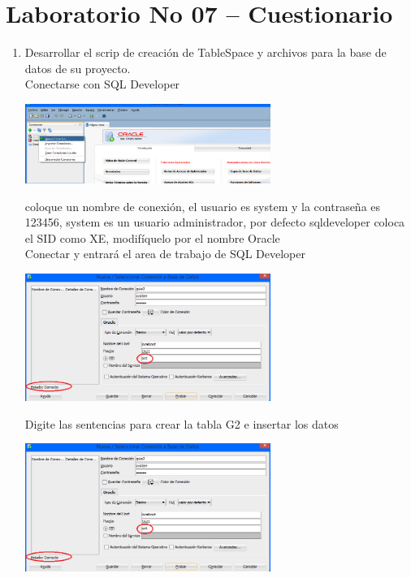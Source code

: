 \section{Laboratorio No 07 – Cuestionario} 

\begin{enumerate}[1.]
	
	\item Desarrollar el scrip de creaci\'on de TableSpace y archivos para la base de datos de su proyecto.
	\\Conectarse con SQL Developer

	\begin{center}
	\includegraphics[width=8cm]{./Imagenes/eje7_con}
	\end{center}	
	coloque un nombre de conexi\'on, el usuario es system y la contraseña es 123456, system es un usuario administrador, por defecto sqldeveloper coloca el SID como XE, modif\'iquelo por el nombre Oracle
	\\Conectar y entrar\'a el area de trabajo de SQL Developer

	\begin{center}
	\includegraphics[width=8cm]{./Imagenes/eje_con1}
	\end{center}	

	Digite las sentencias para crear la tabla G2 e insertar los datos\\
	\begin{center}
	\includegraphics[width=8cm]{./Imagenes/eje_con1}
	\end{center}	


\end{enumerate}
